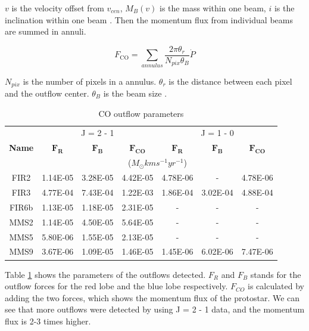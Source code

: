 \documentclass[twoside,11pt]{gshs_thesis}
\begin{document}
$v$ is the velocity offset from $v_{cen}$, $M_B (v)$ is the mass within one beam, $i$ is the inclination within one beam \cite{Hatchell2}.
\newpage
Then the momentum flux from individual beams are summed in annuli. 

\begin{equation}
F_{\textrm{CO}} = \sum _{annulus} \frac{2\pi \theta_r}{N_{pix}\theta_B}\dot{P}	
\end{equation}

$N_{pix}$ is the number of pixels in a annulus. $\theta_r$ is the distance between each pixel and the outflow center. $\theta_B$ is the beam size \cite{Hatchell2, Marel}.


\begin{table}[h]
	\begin{center}
		\begin{tabular}{c|c|c|c||c|c|c}
			\toprule
			\multirow{3}{1cm}{\textbf{Name}} & \multicolumn{3}{c}{J = 2 - 1} & \multicolumn{3}{c}{J = 1 - 0} \\
			& $\mathbf{F_{R}}$ & $\mathbf{F_{B}}$ & $\mathbf{F_{\textrm{CO}}}$ & $\mathbf{F_{R}}$ & $\mathbf{F_{B}}$ & $\mathbf{F_{\textrm{CO}}}$\\
			& \multicolumn{6}{c}{($M_{\odot} km s^{-1} yr^{-1}$)}\\
			\midrule
			FIR2 & 1.14E-05 & 3.28E-05 & 4.42E-05 & 4.78E-06 & - & 4.78E-06\\
			FIR3 & 4.77E-04 & 7.43E-04 & 1.22E-03 & 1.86E-04 & 3.02E-04 & 4.88E-04\\
			FIR6b & 1.13E-05 & 1.18E-05 & 2.31E-05 & - & - & -\\
			MMS2 & 1.14E-05 & 4.50E-05 & 5.64E-05 & - & - & -\\
			MMS5 & 5.80E-06 & 1.55E-05 & 2.13E-05 & - & - & -\\
			MMS9 & 3.67E-06 & 1.09E-05 & 1.46E-05 & 1.45E-06 & 6.02E-06 & 7.47E-06\\
		\end{tabular}
	\end{center}
	\caption{CO outflow parameters} \label{result}
\end{table}


Table \noindent\ref{result} shows the parameters of the outflows detected. $F_R$ and $F_B$ stands for the outflow forces for the red lobe and the blue lobe respectively. $F_{CO}$ is calculated by adding the two forces, which shows the momentum flux of the protostar. We can see that more outflows were detected by using J = 2 - 1 data, and the momentum flux is 2-3 times higher.\\
\end{document}
